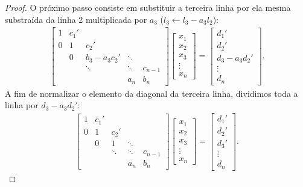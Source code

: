 \begin{proof}
O próximo passo consiste em substituir a terceira linha por ela mesma substraída da linha 2 multiplicada por $a_3$ ($l_3\leftarrow l_3-a_3l_2$):
\begin{eqnarray*} \begin{bmatrix}
   {1} & {c_1'} & {   } & {   } & {   } \\
   {0} & {1} & {c_2'} & {   } & {   } \\
   {   } & { 0 } & {b_3-a_3 c_2'} & \ddots & {   } \\
   {   } & {   } & \ddots & \ddots & {c_{n-1}}\\
   {   } & {   } & {   } & {a_n} & {b_n}
\end{bmatrix}
\begin{bmatrix}
   {x_1 }  \\
   {x_2 }  \\
   {x_3 }  \\
   \vdots   \\
   {x_n }  
\end{bmatrix}
=
\begin{bmatrix}
   {d_1' }  \\
   {d_2' }  \\
   {d_3 - a_3d_2'}  \\
   \vdots   \\
   {d_n }  
\end{bmatrix}.
\end{eqnarray*}
A fim de normalizar o elemento da diagonal da terceira linha, dividimos toda a linha por $d_3 - a_3d_2'$:
\begin{eqnarray*} \begin{bmatrix}
   {1} & {c_1'} & {   } & {   } & {   } \\
   {0} & {1} & {c_2'} & {   } & {   } \\
   {   } & { 0 } & {1} & \ddots & {   } \\
   {   } & {   } & \ddots & \ddots & {c_{n-1}}\\
   {   } & {   } & {   } & {a_n} & {b_n}
\end{bmatrix}
\begin{bmatrix}
   {x_1 }  \\
   {x_2 }  \\
   {x_3 }  \\
   \vdots   \\
   {x_n }  
\end{bmatrix}
=
\begin{bmatrix}
   {d_1' }  \\
   {d_2' }  \\
   {d_3'}  \\
   \vdots   \\
   {d_n }  
\end{bmatrix}.
\end{eqnarray*}


\end{proof}
